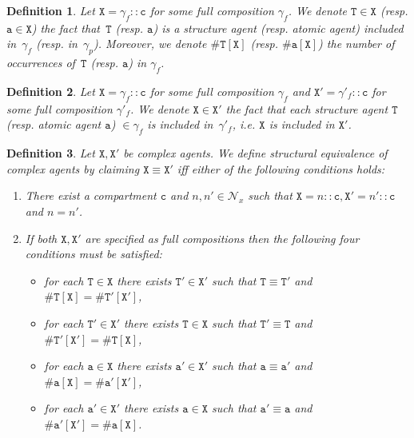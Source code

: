 \documentclass[12pt]{article}
\newtheorem{mydef}{Definition}
\begin{document}
\begin{mydef}
Let $\mathtt{X}=\gamma_f::\mathtt{c}$ for some full composition $\gamma_f$. We denote $\mathtt{T}\in \mathtt{X}$ (resp. $\mathtt{a}\in \mathtt{X}$) the fact that~$\mathtt{T}$ (resp. $\mathtt{a}$) is a structure agent (resp. atomic agent) included in~$\gamma_f$ (resp. in~$\gamma_p$). 
Moreover, we denote $\#\mathtt{T}[\mathtt{X}]$ (resp. $\#\mathtt{a}[\mathtt{X}]$) the number of occurrences of~$\mathtt{T}$ (resp. $\mathtt{a}$) in $\gamma_f$. 
\end{mydef}

\begin{mydef}
Let $\mathtt{X}=\gamma_f::\mathtt{c}$ for some full composition $\gamma_f$ and $\mathtt{X}'=\gamma'_f::\mathtt{c}$ for some full composition $\gamma'_f$. We denote $\mathtt{X} \in \mathtt{X}'$ the fact that each structure agent $\mathtt{T}$ (resp. atomic agent $\mathtt{a}$) $\in \gamma_f$ is included in~$\gamma'_f$, i.e. $\mathtt{X}$ is included in $\mathtt{X}'$.
\end{mydef}

\begin{mydef}
Let $\mathtt{X},\mathtt{X}'$ be complex agents. We define \emph{structural equivalence} of \emph{complex agents} by claiming $\mathtt{X}\equiv\mathtt{X}'$ iff either of the following conditions holds:
\begin{enumerate}
\item There exist a compartment $\mathtt{c}$ and $n,n'\in\mathcal{N}_x$ such that $\mathtt{X}=n::\mathtt{c},\mathtt{X}'=n'::\mathtt{c}$ and $n=n'$.
\item If both $\mathtt{X},\mathtt{X}'$ are specified as full compositions then the following four conditions must be satisfied:

\begin{itemize}
\item for each $\mathtt{T}\in\mathtt{X}$ there exists $\mathtt{T}'\in\mathtt{X}'$ such that $\mathtt{T}\equiv\mathtt{T}'$ and $\#\mathtt{T}[\mathtt{X}]=\#\mathtt{T}'[\mathtt{X}']$,
\item for each $\mathtt{T}'\in\mathtt{X}'$ there exists $\mathtt{T}\in\mathtt{X}$ such that $\mathtt{T}'\equiv\mathtt{T}$ and $\#\mathtt{T}'[\mathtt{X}']=\#\mathtt{T}[\mathtt{X}]$,
\item for each $\mathtt{a}\in\mathtt{X}$ there exists $\mathtt{a}'\in\mathtt{X}'$ such that $\mathtt{a}\equiv\mathtt{a}'$ and $\#\mathtt{a}[\mathtt{X}]=\#\mathtt{a}'[\mathtt{X}']$,
\item for each $\mathtt{a}'\in\mathtt{X}'$ there exists $\mathtt{a}\in\mathtt{X}$ such that $\mathtt{a}'\equiv\mathtt{a}$ and $\#\mathtt{a}'[\mathtt{X}']=\#\mathtt{a}[\mathtt{X}]$.
\end{itemize}

\end{enumerate}
\end{mydef}
\end{document}
